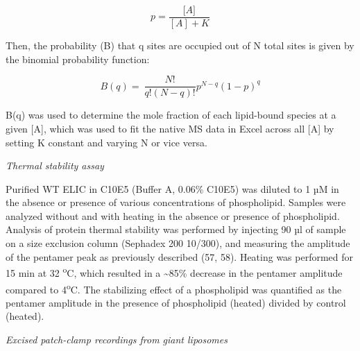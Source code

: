 \[p = \frac{\lbrack A\rbrack}{\left\lbrack A \right\rbrack + K}\]

Then, the probability (B) that q sites are occupied out of N total sites
is given by the binomial probability function:

\[B\left( q \right) = \ \frac{N!}{q!\left( N - q \right)!}p^{N - q}{(1 - p)}^{q}\]

B(q) was used to determine the mole fraction of each lipid-bound species
at a given {[}A{]}, which was used to fit the native MS data in Excel
across all {[}A{]} by setting K constant and varying N or vice versa.

\emph{Thermal stability assay}

Purified WT ELIC in C10E5 (Buffer A, 0.06\% C10E5) was diluted to 1 µM
in the absence or presence of various concentrations of phospholipid.
Samples were analyzed without and with heating in the absence or
presence of phospholipid. Analysis of protein thermal stability was
performed by injecting 90 µl of sample on a size exclusion column
(Sephadex 200 10/300), and measuring the amplitude of the pentamer peak
as previously described (57, 58). Heating was performed for 15 min at 32
\textsuperscript{o}C, which resulted in a \textasciitilde{}85\% decrease
in the pentamer amplitude compared to 4\textsuperscript{o}C. The
stabilizing effect of a phospholipid was quantified as the pentamer
amplitude in the presence of phospholipid (heated) divided by control
(heated).

\emph{Excised patch-clamp recordings from giant liposomes}

